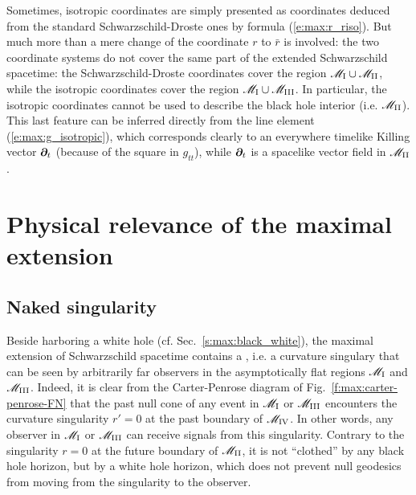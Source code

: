 \begin{remark}
Sometimes, isotropic coordinates are simply presented as
coordinates deduced from the standard Schwarzschild-Droste ones by
formula (\ref{e:max:r_riso}). But much more than a mere change
of the coordinate $r$ to $\bar{r}$ is involved:
the two coordinate systems do not cover
the same part of the extended Schwarzschild spacetime: the Schwarzschild-Droste
coordinates cover the region $\mathscr{M}_{\rm I}\cup \mathscr{M}_{\rm II}$, while the
isotropic coordinates cover the region $\mathscr{M}_{\rm I}\cup \mathscr{M}_{\rm III}$.
In particular, the isotropic coordinates cannot be used to describe the black
hole interior (i.e. $\mathscr{M}_{\rm II}$). This last feature can be inferred directly
from the line element (\ref{e:max:g_isotropic}), which corresponds clearly to
an everywhere timelike Killing vector $\bm{\partial}_t$ (because of the square in $g_{tt}$), while
$\bm{\partial}_t$ is a spacelike vector field in $\mathscr{M}_{\rm II}$.
\end{remark}


\section{Physical relevance of the maximal extension} \label{s:max:relevance}

\subsection{Naked singularity}

Beside harboring a white hole (cf. Sec.~\ref{s:max:black_white}),
the maximal extension of Schwarzschild spacetime
contains a
,
i.e. a curvature singulary that can be seen by arbitrarily far observers
in the asymptotically flat regions $\mathscr{M}_{\rm I}$ and $\mathscr{M}_{\rm III}$.
Indeed, it is clear from
the Carter-Penrose diagram of Fig.~\ref{f:max:carter-penrose-FN} that the
past null cone of any event in $\mathscr{M}_{\rm I}$ or $\mathscr{M}_{\rm III}$ encounters the
curvature singularity $r'=0$ at the past boundary of $\mathscr{M}_{\rm IV}$. In other words,
any observer in $\mathscr{M}_{\rm I}$ or $\mathscr{M}_{\rm III}$ can receive signals from
this singularity. Contrary to the singularity $r=0$ at the future boundary of $\mathscr{M}_{\rm II}$,
it is not ``clothed'' by any black hole horizon, but by a white hole horizon, which does not prevent
null geodesics from moving from the singularity to the observer.

